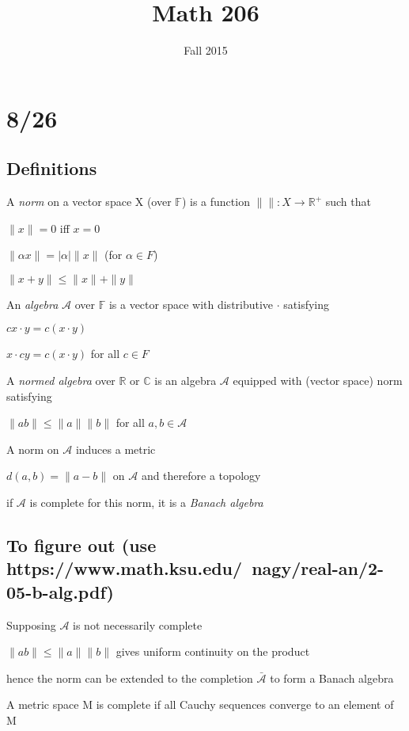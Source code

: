 \documentclass[12pt]{article}
\title{Math 206}
\date{\normalsize Fall 2015}
\begin{document}
\maketitle

\section{8/26}

\subsection{Definitions}

\noindent
A \textit{norm} on a vector space X (over $\mathds{F}$) is a function $\| \|:X \rightarrow \mathds{R}^+$ such that

$\|x\| = 0$ iff $x = 0$

$\|\alpha x\| = |\alpha|\|x\|$ (for $\alpha \in F$)

$\|x + y\| \leq \|x\| + \|y\|$

\noindent
An \textit{algebra} $\mathscr{A}$ over $\mathds{F}$ is a vector space with distributive $\cdot$ satisfying

$cx \cdot y = c(x \cdot y)$

$x \cdot cy = c(x \cdot y)$ for all $c \in F$


\noindent
A \textit{normed algebra} over $\mathds{R}$ or $\mathds{C}$ is an algebra $\mathscr{A}$ equipped with (vector space) norm satisfying

$\|ab\| \leq \|a\|\|b\|$ for all $a,b \in \mathscr{A}$

\noindent
A norm on $\mathscr{A}$ induces a metric 

$d(a, b) = \|a - b\|$ on $\mathscr{A}$ and therefore a topology

if $\mathscr{A}$ is complete for this norm, it is a \textit{Banach algebra}

\subsection{To figure out (use https://www.math.ksu.edu/~nagy/real-an/2-05-b-alg.pdf)}

\noindent
Supposing $\mathscr{A}$ is not necessarily complete

$\|ab\| \leq \|a\|\|b\|$ gives uniform continuity on the product

hence the norm can be extended to the completion $\bar{\mathscr{A}}$ to form a Banach algebra

\noindent
A metric space M is complete if all Cauchy sequences converge to an element of M
\end{document}
